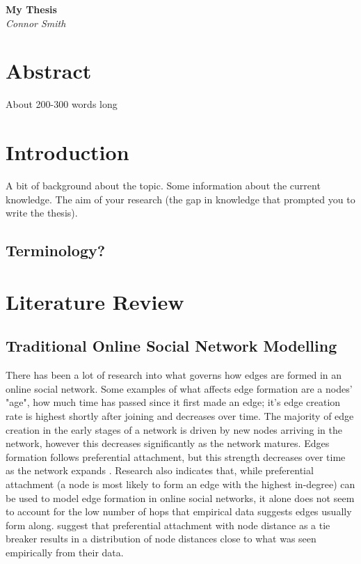 \documentclass[12pt]{article}
\begin{document}
\begin{titlepage}
   \begin{center}
      \Large\textbf{My Thesis}\\
      \large\textit{Connor Smith}
   \end{center}
\end{titlepage}
\section{Abstract}
About 200-300 words long\\

\section{Introduction}
A bit of background about the topic.
Some information about the current knowledge.
The aim of your research (the gap in knowledge that prompted you to write the thesis).
    \subsection{Terminology?}
        
\section{Literature Review}
    \subsection{Traditional Online Social Network Modelling}
        There has been a lot of research into what governs how edges are formed in an online social network. Some examples of what affects edge formation are a nodes' "age", how much time has passed since it first made an edge; it's edge creation rate is highest shortly after joining and decreases over time. The majority of edge creation in the early stages of a network is driven by new nodes arriving in the network, however this decreases significantly as the network matures. Edges formation follows preferential attachment, but this strength decreases over time as the network expands \cite{zhao2012multi}. Research also indicates that, while preferential attachment (a node is most likely to form an edge with the highest in-degree) can be used to model edge formation in online social networks, it alone does not seem to account for the low number of hops that empirical data suggests edges usually form along. \cite{garg2009evolution} suggest that preferential attachment with node distance as a tie breaker results in a distribution of node distances close to what was seen empirically from  their data.\\
        
\end{document}
